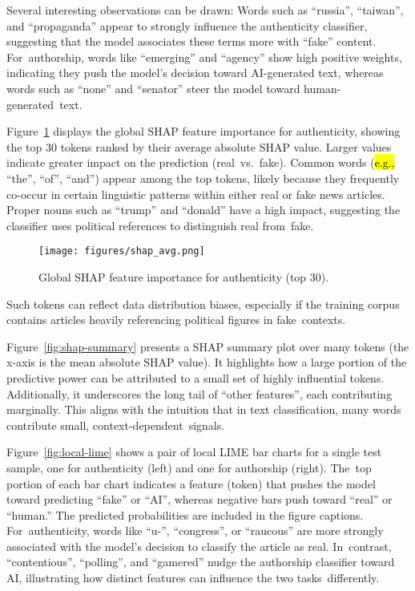 \documentclass[electronics,article,accept,pdftex,moreauthors,electronics]{Definitions/mdpi}
\begin{document}
Several interesting observations can be drawn: Words such as ``russia'', ``taiwan'', and ``propaganda'' appear to strongly influence the authenticity classifier, suggesting that the model associates these terms more with ``fake'' content. For~authorship, words like ``emerging'' and ``agency'' show high positive weights, indicating they push the model's decision toward AI-generated text, whereas words such as ``none'' and ``senator'' steer the model toward human-generated~text.



Figure~\ref{fig:global-shap-auth} displays the global SHAP feature importance for authenticity, showing the top 30 tokens ranked by their average absolute SHAP value. Larger values indicate greater impact on the prediction (real~vs.~fake). Common words (\hl{e.g.,} ``the'', ``of'', ``and'') appear among the top tokens, likely because they frequently co-occur in certain linguistic patterns within either real or fake news articles. Proper nouns such as ``trump'' and ``donald'' have a high impact, suggesting the classifier uses political references to distinguish real from~fake.

\vspace{-4pt}
\begin{figure}[H]
    \texttt{[image: figures/shap\_avg.png]}\vspace{-4pt}
    \caption{Global SHAP feature importance for authenticity (top 30).}
    \label{fig:global-shap-auth}
\end{figure}


Such tokens can reflect data distribution biases, especially if the training corpus contains articles heavily referencing political figures in fake~contexts.

Figure~\ref{fig:shap-summary} presents a SHAP summary plot over many tokens (the x-axis is the mean absolute SHAP value). It highlights how a large portion of the predictive power can be attributed to a small set of highly influential tokens. Additionally, it underscores the long tail of ``other features'', each contributing marginally. This aligns with the intuition that in text classification, many words contribute small, context-dependent~signals.

Figure~\ref{fig:local-lime} shows a pair of local LIME bar charts for a single test sample, one for authenticity (left) and one for authorship (right). The~top portion of each bar chart indicates a feature (token) that pushes the model toward predicting ``fake'' or ``AI'', whereas negative bars push toward ``real'' or ``human.'' The predicted probabilities are included in the figure captions. For~authenticity, words like ``u-'', ``congress'', or ``raucous'' are more strongly associated with the model’s decision to classify the article as real. In~contrast, ``contentious'', ``polling'', and ``gamered'' nudge the authorship classifier toward AI, illustrating how distinct features can influence the two tasks~differently.
\end{document}
